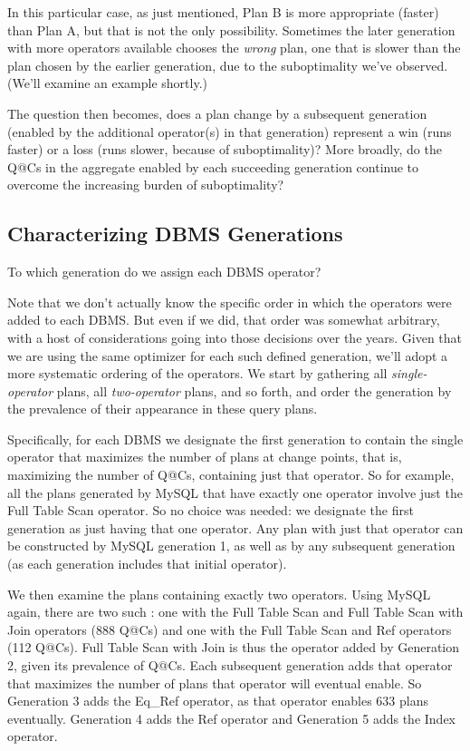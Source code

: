 \documentclass[prodmode,acmtods]{acmsmall}
\begin{document}
In this particular case, as just mentioned, Plan B is more appropriate (faster) than Plan A,
but that is not the only possibility. Sometimes the later generation with
more operators available chooses the {\em wrong} plan, one that is slower
than the plan chosen by the earlier generation, due to the suboptimality
we've observed. (We'll examine an example shortly.)

The question then becomes, does a plan change by a subsequent generation
(\hbox{enabled} by the additional operator(s) in that generation) represent a win (runs faster)
or a loss (runs slower, because of suboptimality)? More broadly, do the Q@Cs
in the aggregate enabled by each succeeding generation continue to overcome
the increasing burden of suboptimality?

\subsection{Characterizing \hbox{DBMS} Generations}
To which generation do we assign each \hbox{DBMS} operator?

Note that we don't actually know the specific order in which the operators
were added to each \hbox{DBMS}. But even if we did, that order was somewhat
arbitrary, with a host of considerations going into those decisions over the
years. Given that we are using the same optimizer for each such defined
generation, we'll adopt a more systematic ordering of the operators. We
start by gathering all {\em single-operator} plans, all {\em two-operator} plans,
and so forth, and order the generation by the prevalence of their
\hbox{appearance} in these query plans.

Specifically, for each \hbox{DBMS} we designate the first
generation to contain the single operator that maximizes the number of plans
at change points, that is, maximizing the number of Q@Cs, containing just that
operator. So for example, all the plans generated by MySQL that have exactly
one operator involve just the Full Table Scan operator.  So no choice was
needed: we designate the
first generation as just having that one operator. Any plan with just that
operator can be constructed by MySQL generation 1, as well as by any
subsequent generation (as each generation includes that initial operator).

We then examine the plans containing exactly two operators.
Using MySQL again, there are two such : one with the Full Table Scan and
Full Table Scan with Join operators (888 Q@Cs) and
one with the Full Table Scan and Ref operators (112 Q@Cs). Full
Table Scan with Join is thus the operator added by Generation 2, given its
prevalence of Q@Cs. Each
subsequent generation adds that operator that maximizes the number of plans
that operator will eventual enable. So Generation 3 adds the Eq\_Ref operator,
as that operator enables 633 plans eventually. Generation 4 adds the Ref
operator and Generation 5 adds the Index operator. 
\end{document}
